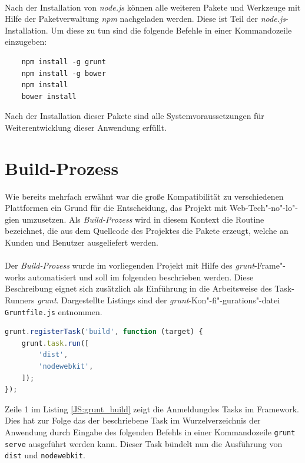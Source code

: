 \paragraph{}Nach der Installation von \textit{node.js} können alle weiteren Pakete und Werkzeuge mit Hilfe der Paketverwaltung \textit{npm} nachgeladen werden. Diese ist Teil der \textit{node.js}-Installation. Um diese zu tun sind die folgende Befehle in einer Kommandozeile einzugeben:

\begin{lstlisting}
	npm install -g grunt
	npm install -g bower
	npm install
	bower install
\end{lstlisting}

Nach der Installation dieser Pakete sind alle Systemvoraussetzungen für Weiterentwicklung dieser Anwendung erfüllt.

\section{Build-Prozess}
Wie bereits mehrfach erwähnt war die große Kompatibilität zu verschiedenen Plattformen ein Grund für die Entscheidung, das Projekt mit Web-Tech"-no"-lo"-gien umzusetzen. Als \textit{Build-Prozess} wird in diesem Kontext die Routine bezeichnet, die aus dem Quellcode des Projektes die Pakete erzeugt, welche an Kunden und Benutzer ausgeliefert werden.

\paragraph{}Der \textit{Build-Prozess} wurde im vorliegenden Projekt mit Hilfe des \textit{grunt}-Frame"-works automatisiert und soll im folgenden beschrieben werden. Diese Beschreibung eignet sich zusätzlich als Einführung in die Arbeitsweise des \glqq Task-Runners \grqq \textit{grunt}. Dargestellte Listings sind der \textit{grunt}-Kon"-fi"-gurations"-datei \\\texttt{Gruntfile.js} entnommen.

\begin{lstlisting}[language=JavaScript,label=JS:grunt_build,caption=grunt build-Task]
grunt.registerTask('build', function (target) {
	grunt.task.run([
		'dist',
		'nodewebkit',
	]);
});
\end{lstlisting}

Zeile 1 im Listing \ref{JS:grunt_build} zeigt die \glqq Anmeldung\grqq des Tasks im Framework. Dies hat zur Folge das der beschriebene Task im Wurzelverzeichnis der Anwendung durch Eingabe des folgenden Befehls in einer Kommandozeile \texttt{grunt serve} ausgeführt werden kann. Dieser Task bündelt nun die Ausführung von \texttt{dist} und \texttt{nodewebkit}.


